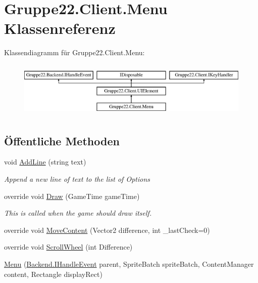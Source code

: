 \hypertarget{class_gruppe22_1_1_client_1_1_menu}{\section{Gruppe22.\-Client.\-Menu Klassenreferenz}
\label{class_gruppe22_1_1_client_1_1_menu}
}
Klassendiagramm für Gruppe22.\-Client.\-Menu\-:\begin{figure}[H]
\begin{center}
\leavevmode
\includegraphics[height=2.692308cm]{class_gruppe22_1_1_client_1_1_menu}
\end{center}
\end{figure}
\subsection*{Öffentliche Methoden}
\begin{DoxyCompactItemize}
\item 
void \hyperlink{class_gruppe22_1_1_client_1_1_menu_ad4acef65eca04e02d56b3360b1d2692b}{Add\-Line} (string text)
\begin{DoxyCompactList}\small\item\em Append a new line of text to the list of Options \end{DoxyCompactList}\item 
override void \hyperlink{class_gruppe22_1_1_client_1_1_menu_ab51c72e83507c3eb2652456e1951acc4}{Draw} (Game\-Time game\-Time)
\begin{DoxyCompactList}\small\item\em This is called when the game should draw itself. \end{DoxyCompactList}\item 
override void \hyperlink{class_gruppe22_1_1_client_1_1_menu_a4fdd1df14f4cffa4fc2d164d9bc468f3}{Move\-Content} (Vector2 difference, int \-\_\-last\-Check=0)
\item 
override void \hyperlink{class_gruppe22_1_1_client_1_1_menu_a699aecf4ccf96cbf17a19d8c56d2cfd8}{Scroll\-Wheel} (int Difference)
\item 
\hyperlink{class_gruppe22_1_1_client_1_1_menu_ab8b07183b7dea58a5560e8b44da3e807}{Menu} (\hyperlink{interface_gruppe22_1_1_backend_1_1_i_handle_event}{Backend.\-I\-Handle\-Event} parent, Sprite\-Batch sprite\-Batch, Content\-Manager content, Rectangle display\-Rect)
\end{DoxyCompactItemize}
